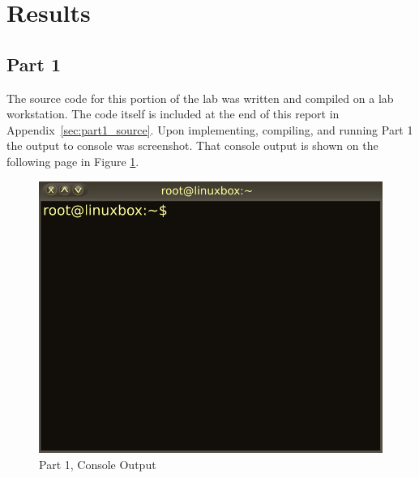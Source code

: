 
\section{Results}\label{sec:results}


    \subsection{Part 1}\label{subsec:part1}
        \lipsum[1]

        \medskip
        \noindent The source code for this portion of the lab was written and compiled on a lab workstation.
        The code itself is included at the end of this report in Appendix~\ref{sec:part1_source}.
        Upon implementing, compiling, and running Part 1 the output to console was screenshot.
        That console output is shown on the following page in Figure \ref{fig:part1_output}.

        \begin{figure}[H]
            \centering
            \includegraphics[width=\linewidth]{figures/lab1_1.png}
            \caption{Part 1, Console Output}
            \label{fig:part1_output}
        \end{figure}
